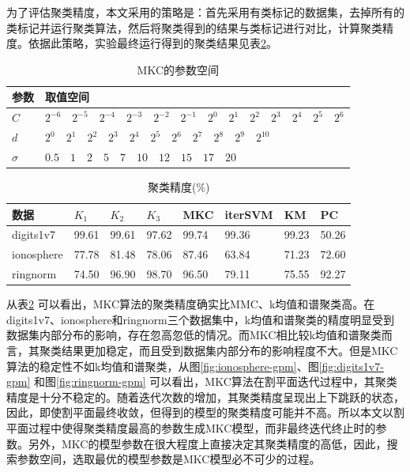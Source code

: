 为了评估聚类精度，本文采用的策略是：首先采用有类标记的数据集，去掉所有的类标记并运行聚类算法，然后将聚类得到的结果与类标记进行对比，计算聚类精度。依据此策略，实验最终运行得到的聚类结果见表\ref{tab:result}。
\begin{table}[!htbp]
\caption{MKC的参数空间}
\centering
\small
\renewcommand\arraystretch{1.5}
\begin{tabular}{p{1.5cm}<{\centering}|p{12cm}}
\hline
参数 & \hspace{0.5cm}取值空间\\
\hline
$C$ &  \hspace{0.5cm}$2^{-6} \quad 2^{-5} \quad 2^{-4} \quad 2^{-3} \quad 2^{-2} \quad 2^{-1} \quad 2^{0} \quad 2^{1} \quad 2^{2} \quad 2^{3} \quad 2^{4} \quad 2^{5} \quad 2^{6} $\\
\hline
$d$ &  \hspace{0.5cm}$2^{0} \quad 2^{1} \quad 2^{2} \quad 2^{3} \quad 2^{4} \quad 2^{5} \quad 2^{6} \quad 2^{7} \quad 2^{8} \quad 2^{9} \quad 2^{10}$ \\
\hline
$\sigma$ &  \hspace{0.5cm}$0.5 \quad 1 \quad 2 \quad 5 \quad 7 \quad 10 \quad 12 \quad 15 \quad 17 \quad 20 $\\
\hline
\end{tabular}
\label{tab:para}
\end{table} 

\begin{table}[!htbp]
\caption{聚类精度(\%)}
\centering
\small
\renewcommand\arraystretch{1.5}
\begin{tabular}{|p{2cm}<{\centering}|p{1.3cm}<{\centering}|p{1.3cm}<{\centering}|p{1.3cm}<{\centering}|p{1.3cm}<{\centering}|p{1.3cm}<{\centering}|p{1.3cm}<{\centering}|p{1.3cm}<{\centering}|}
\hline
数据 & $K_1$ & $K_2$ & $K_3$ & MKC & iterSVM & KM & PC \\
\hline
digits1v7 & 99.61 & 99.61 & 97.62 & 99.74 & 99.36 & 99.23 & 50.26 \\
\hline
ionosphere & 77.78 & 81.48 & 78.06 & 87.46 & 63.84 & 71.23 & 72.60 \\
\hline
ringnorm & 74.50 & 96.90 & 98.70 & 96.50 & 79.11 & 75.55 & 92.27 \\
\hline
\end{tabular}
\label{tab:result}
\end{table}

从表\ref{tab:result} 可以看出，MKC算法的聚类精度确实比MMC、k均值和谱聚类高。在digits1v7、ionosphere和ringnorm三个数据集中，k均值和谱聚类的精度明显受到数据集内部分布的影响，存在忽高忽低的情况。而MKC相比较k均值和谱聚类而言，其聚类结果更加稳定，而且受到数据集内部分布的影响程度不大。但是MKC算法的稳定性不如k均值和谱聚类，从图\ref{fig:ionosphere-gpm}、图\ref{fig:digits1v7-gpm} 和图\ref{fig:ringnorm-gpm} 可以看出，MKC算法在割平面迭代过程中，其聚类精度是十分不稳定的。随着迭代次数的增加，其聚类精度呈现出上下跳跃的状态，因此，即使割平面最终收敛，但得到的模型的聚类精度可能并不高。所以本文以割平面过程中使得聚类精度最高的参数生成MKC模型，而非最终迭代终止时的参数。另外，MKC的模型参数在很大程度上直接决定其聚类精度的高低，因此，搜索参数空间，选取最优的模型参数是MKC模型必不可少的过程。

